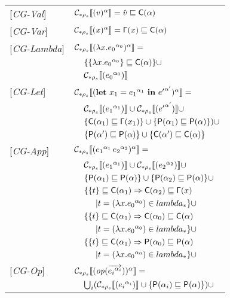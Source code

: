 \begin{table}
\begin{tabular}{l l l l}
{[\textit{CG-Val}]} & \multicolumn{3}{l}{$ \mathcal{C}_{*\rho_s}\llbracket (v)^\alpha \rrbracket = \hat{v} \sqsubseteq \mathsf{C}(\alpha)$} \\ 
{[\textit{CG-Var}]} & \multicolumn{3}{l}{$ \mathcal{C}_{*\rho_s}\llbracket (x)^\alpha \rrbracket = \mathsf{\Gamma}(x) \sqsubseteq \mathsf{C}(\alpha)$} \\ 
{[\textit{CG-Lambda}]} & \multicolumn{3}{l}{$ \mathcal{C}_{*\rho_s}\llbracket (\lambda x.{e_0}^{\alpha_0})^\alpha \rrbracket = $}\\
&& \multicolumn{2}{l}{$\{\{\lambda x.{e_0}^{\alpha_0}\} \sqsubseteq \mathsf{C}(\alpha)\}\cup $}\\
&& \multicolumn{2}{l}{$ \mathcal{C}_{*\rho_s}\llbracket ({e_0}^{\alpha_0}) \rrbracket $} \\
{[\textit{CG-Let}]} & \multicolumn{3}{l}{$\mathcal{C}_{*\rho_s}\llbracket (\mathbf{let}\ x_1 = {e_1}^{\alpha_1}\ \mathbf{in}\ {e'}^{\alpha'})^\alpha \rrbracket = $}\\
&& \multicolumn{2}{l}{$ \mathcal{C}_{*\rho_s}\llbracket ({e_1}^{\alpha_1}) \rrbracket \cup \mathcal{C}_{*\rho_s}\llbracket ({e'}^{\alpha'}) \rrbracket \cup$ }\\
&& \multicolumn{2}{l}{$ \{\mathsf{C}(\alpha_1) \sqsubseteq \mathsf{\Gamma}(x_1)\} \cup \{ \mathsf{P}(\alpha_1) \sqsubseteq \mathsf{P}(\alpha) \}) \cup $} \\
&& \multicolumn{2}{l}{$ \{\mathsf{P}(\alpha') \sqsubseteq \mathsf{P}(\alpha)\} \cup \{\mathsf{C}(\alpha') \sqsubseteq \mathsf{C}(\alpha)\} $}\\
{[\textit{CG-App}]}&\multicolumn{3}{l}{$ \mathcal{C}_{*\rho_s}\llbracket ({e_1}^{\alpha_1}\, {e_2}^{\alpha_2})^\alpha \rrbracket = $}\\
&& \multicolumn{2}{l}{$\mathcal{C}_{*\rho_s}\llbracket ({e_1}^{\alpha_1}) \rrbracket \cup \mathcal{C}_{*\rho_s}\llbracket ({e_2}^{\alpha_2}) \rrbracket \cup$} \\
&& \multicolumn{2}{l}{$\{ \mathsf{P}(\alpha_1) \sqsubseteq \mathsf{P}(\alpha) \} \cup \{ \mathsf{P}(\alpha_2) \sqsubseteq \mathsf{P}(\alpha) \}\cup$} \\
&& \multicolumn{2}{l}{$\{\{ t \} \sqsubseteq \mathsf{C}(\alpha_1) \Rightarrow \mathsf{C}(\alpha_2) \sqsubseteq \mathsf{\Gamma}(x)$}\\
&&&$| t = (\lambda x.{e_0}^{\alpha_0}) \in lambda_* \}\cup$\\
&& \multicolumn{2}{l}{$\{\{ t \} \sqsubseteq \mathsf{C}(\alpha_1) \Rightarrow \mathsf{C}(\alpha_0) \sqsubseteq \mathsf{C}(\alpha)$}\\
&&&$| t = (\lambda x.{e_0}^{\alpha_0}) \in lambda_* \}\cup$\\
&& \multicolumn{2}{l}{$\{\{ t \} \sqsubseteq \mathsf{C}(\alpha_1) \Rightarrow \mathsf{P}(\alpha_0) \sqsubseteq \mathsf{P}(\alpha)$}\\
&&&$| t = (\lambda x.{e_0}^{\alpha_0}) \in lambda_* \}\cup$\\
{[\textit{CG-Op}]}&\multicolumn{3}{l}{$ \mathcal{C}_{*\rho_s}\llbracket (\mathit{op} (\overrightarrow{{e_i}^{\alpha_i}}))^\alpha \rrbracket = $}\\
&&\multicolumn{2}{l}{$\bigcup_i (\mathcal{C}_{*\rho_s}\llbracket ({e_i}^{\alpha_i}) \rrbracket \cup \{ \mathsf{P}(\alpha_i) \sqsubseteq \mathsf{P}(\alpha) \})\cup$}\\

\end{tabular}
\end{table}
